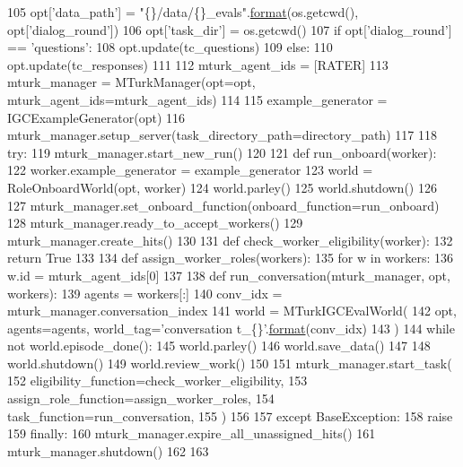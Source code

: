 \begin{DoxyCode}
105         opt[\textcolor{stringliteral}{'data\_path'}] = \textcolor{stringliteral}{"\{\}/data/\{\}\_evals"}.\hyperlink{namespaceparlai_1_1chat__service_1_1services_1_1messenger_1_1shared__utils_a32e2e2022b824fbaf80c747160b52a76}{format}(os.getcwd(), opt[\textcolor{stringliteral}{'dialog\_round'}])
106     opt[\textcolor{stringliteral}{'task\_dir'}] = os.getcwd()
107     \textcolor{keywordflow}{if} opt[\textcolor{stringliteral}{'dialog\_round'}] == \textcolor{stringliteral}{'questions'}:
108         opt.update(tc\_questions)
109     \textcolor{keywordflow}{else}:
110         opt.update(tc\_responses)
111 
112     mturk\_agent\_ids = [RATER]
113     mturk\_manager = MTurkManager(opt=opt, mturk\_agent\_ids=mturk\_agent\_ids)
114 
115     example\_generator = IGCExampleGenerator(opt)
116     mturk\_manager.setup\_server(task\_directory\_path=directory\_path)
117 
118     \textcolor{keywordflow}{try}:
119         mturk\_manager.start\_new\_run()
120 
121         \textcolor{keyword}{def }run\_onboard(worker):
122             worker.example\_generator = example\_generator
123             world = RoleOnboardWorld(opt, worker)
124             world.parley()
125             world.shutdown()
126 
127         mturk\_manager.set\_onboard\_function(onboard\_function=run\_onboard)
128         mturk\_manager.ready\_to\_accept\_workers()
129         mturk\_manager.create\_hits()
130 
131         \textcolor{keyword}{def }check\_worker\_eligibility(worker):
132             \textcolor{keywordflow}{return} \textcolor{keyword}{True}
133 
134         \textcolor{keyword}{def }assign\_worker\_roles(workers):
135             \textcolor{keywordflow}{for} w \textcolor{keywordflow}{in} workers:
136                 w.id = mturk\_agent\_ids[0]
137 
138         \textcolor{keyword}{def }run\_conversation(mturk\_manager, opt, workers):
139             agents = workers[:]
140             conv\_idx = mturk\_manager.conversation\_index
141             world = MTurkIGCEvalWorld(
142                 opt, agents=agents, world\_tag=\textcolor{stringliteral}{'conversation t\_\{\}'}.\hyperlink{namespaceparlai_1_1chat__service_1_1services_1_1messenger_1_1shared__utils_a32e2e2022b824fbaf80c747160b52a76}{format}(conv\_idx)
143             )
144             \textcolor{keywordflow}{while} \textcolor{keywordflow}{not} world.episode\_done():
145                 world.parley()
146             world.save\_data()
147 
148             world.shutdown()
149             world.review\_work()
150 
151         mturk\_manager.start\_task(
152             eligibility\_function=check\_worker\_eligibility,
153             assign\_role\_function=assign\_worker\_roles,
154             task\_function=run\_conversation,
155         )
156 
157     \textcolor{keywordflow}{except} BaseException:
158         \textcolor{keywordflow}{raise}
159     \textcolor{keywordflow}{finally}:
160         mturk\_manager.expire\_all\_unassigned\_hits()
161         mturk\_manager.shutdown()
162 
163 
\end{DoxyCode}


